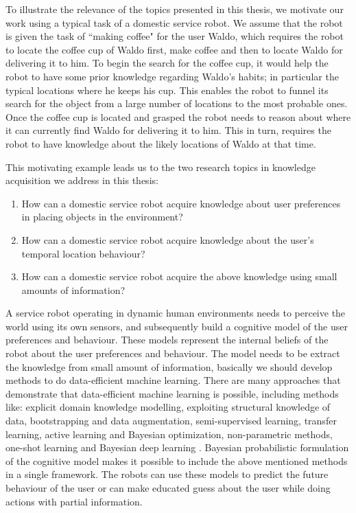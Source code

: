To illustrate the relevance of the topics presented in this thesis, we motivate our work using a typical task of a domestic service robot.   We assume that the robot is given the task of ``making coffee" for the user Waldo, which requires the robot to locate the coffee cup of Waldo first, make coffee and then to locate Waldo for delivering it to him. To begin the search for the coffee cup, it would help the robot to have some prior knowledge regarding Waldo's habits; in particular the typical locations where he keeps his cup. This enables the robot to funnel its search for the object from a large number of locations to the most probable ones. Once the coffee cup is located and grasped the robot needs to reason about where it can currently find Waldo for delivering it to him. This in turn, requires the robot to have knowledge about the likely locations of Waldo at that time.

This motivating example leads us to the two research topics in knowledge acquisition we address in this thesis:
\begin{enumerate}
	\item How can a domestic service robot acquire knowledge about user preferences in placing objects in the environment?
	\item How can a domestic service robot acquire knowledge about the user's temporal location behaviour?
	\item How can a domestic service robot acquire the above knowledge using small amounts of information?
\end{enumerate}

A service robot operating in dynamic human environments needs to perceive the world using its own sensors, and subsequently build a cognitive model of the user preferences and behaviour. These models represent the internal beliefs of the robot about the user preferences and behaviour. The model needs to be extract the knowledge from small amount of information, basically we should develop methods to do data-efficient machine learning. There are many approaches that demonstrate that data-efficient machine learning is possible, including methods like: explicit domain knowledge modelling, exploiting structural knowledge of data, bootstrapping and data augmentation, semi-supervised learning, transfer learning, active learning and Bayesian optimization, non-parametric methods, one-shot learning and Bayesian deep learning \cite{https://sites.google.com/site/dataefficientml/home}. 
Bayesian probabilistic formulation of the cognitive model makes it possible to include the above mentioned methods in a single framework. The robots can use these models to predict the future behaviour of the user or can make educated guess about the user while doing actions with partial information.


